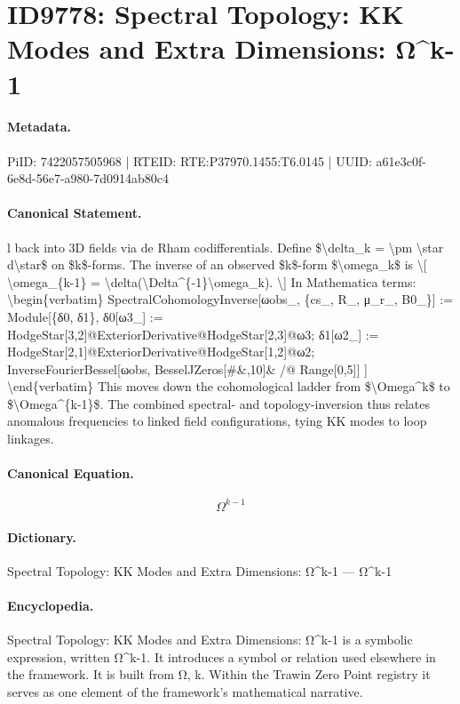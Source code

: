 \section*{ID9778: Spectral Topology: KK Modes and Extra Dimensions: Ω\textasciicircum{}k-1}
\paragraph{Metadata.}
PiID: 7422057505968 | RTEID: RTE:P37970.1455:T6.0145 | UUID: a61e3c0f-6e8d-56e7-a980-7d0914ab80c4

\paragraph{Canonical Statement.}
l back into 3D fields via de Rham codifferentials. Define \$\textbackslash{}delta\_k = \textbackslash{}pm \textbackslash{}star d\textbackslash{}star\$ on \$k\$-forms. The inverse of an observed \$k\$-form \$\textbackslash{}omega\_k\$ is \textbackslash{}[ \textbackslash{}omega\_\{k-1\} = \textbackslash{}delta(\textbackslash{}Delta\textasciicircum{}\{-1\}\textbackslash{}omega\_k). \textbackslash{}] In Mathematica terms: \textbackslash{}begin\{verbatim\} SpectralCohomologyInverse[ωobs\_, \{cs\_, R\_, μ\_r\_, B0\_\}] := Module[\{δ0, δ1\}, δ0[ω3\_] := HodgeStar[3,2]@ExteriorDerivative@HodgeStar[2,3]@ω3; δ1[ω2\_] := HodgeStar[2,1]@ExteriorDerivative@HodgeStar[1,2]@ω2; InverseFourierBessel[ωobs, BesselJZeros[\#\&,10]\& /@ Range[0,5]] ] \textbackslash{}end\{verbatim\} This moves down the cohomological ladder from \$\textbackslash{}Omega\textasciicircum{}k\$ to \$\textbackslash{}Omega\textasciicircum{}\{k-1\}\$. The combined spectral- and topology-inversion thus relates anomalous frequencies to linked field configurations, tying KK modes to loop linkages.

\paragraph{Canonical Equation.}
\[
\Omega^{k-1}
\]

\paragraph{Dictionary.}
Spectral Topology: KK Modes and Extra Dimensions: Ω\textasciicircum{}k-1 — Ω\textasciicircum{}k-1

\paragraph{Encyclopedia.}
Spectral Topology: KK Modes and Extra Dimensions: Ω\textasciicircum{}k-1 is a symbolic expression, written Ω\textasciicircum{}k-1. It introduces a symbol or relation used elsewhere in the framework. It is built from Ω, k. Within the Trawin Zero Point registry it serves as one element of the framework's mathematical narrative.
